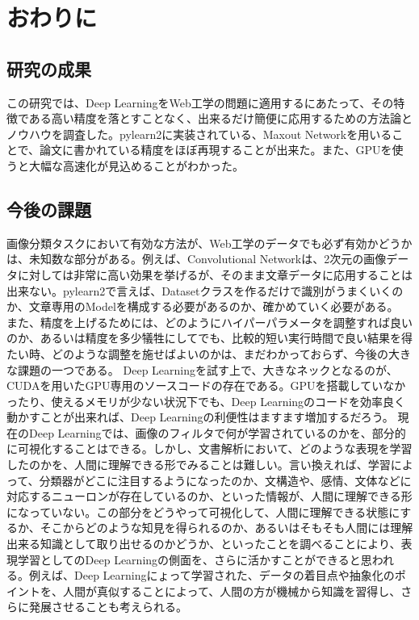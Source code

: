\chapter{おわりに}
\section{研究の成果}
この研究では、Deep LearningをWeb工学の問題に適用するにあたって、その特徴である高い精度を落とすことなく、出来るだけ簡便に応用するための方法論とノウハウを調査した。pylearn2に実装されている、Maxout Networkを用いることで、論文に書かれている精度をほぼ再現することが出来た。また、GPUを使うと大幅な高速化が見込めることがわかった。

\section{今後の課題}
画像分類タスクにおいて有効な方法が、Web工学のデータでも必ず有効かどうかは、未知数な部分がある。例えば、Convolutional Networkは、2次元の画像データに対しては非常に高い効果を挙げるが、そのまま文章データに応用することは出来ない。pylearn2で言えば、Datasetクラスを作るだけで識別がうまくいくのか、文章専用のModelを構成する必要があるのか、確かめていく必要がある。
また、精度を上げるためには、どのようにハイパーパラメータを調整すれば良いのか、あるいは精度を多少犠牲にしてでも、比較的短い実行時間で良い結果を得たい時、どのような調整を施せばよいのかは、まだわかっておらず、今後の大きな課題の一つである。
Deep Learningを試す上で、大きなネックとなるのが、CUDAを用いたGPU専用のソースコードの存在である。GPUを搭載していなかったり、使えるメモリが少ない状況下でも、Deep Learningのコードを効率良く動かすことが出来れば、Deep Learningの利便性はますます増加するだろう。
現在のDeep Learningでは、画像のフィルタで何が学習されているのかを、部分的に可視化することはできる。しかし、文書解析において、どのような表現を学習したのかを、人間に理解できる形でみることは難しい。言い換えれば、学習によって、分類器がどこに注目するようになったのか、文構造や、感情、文体などに対応するニューロンが存在しているのか、といった情報が、人間に理解できる形になっていない。この部分をどうやって可視化して、人間に理解できる状態にするか、そこからどのような知見を得られるのか、あるいはそもそも人間には理解出来る知識として取り出せるのかどうか、といったことを調べることにより、表現学習としてのDeep Learningの側面を、さらに活かすことができると思われる。例えば、Deep Learningにょって学習された、データの着目点や抽象化のポイントを、人間が真似することによって、人間の方が機械から知識を習得し、さらに発展させることも考えられる。
